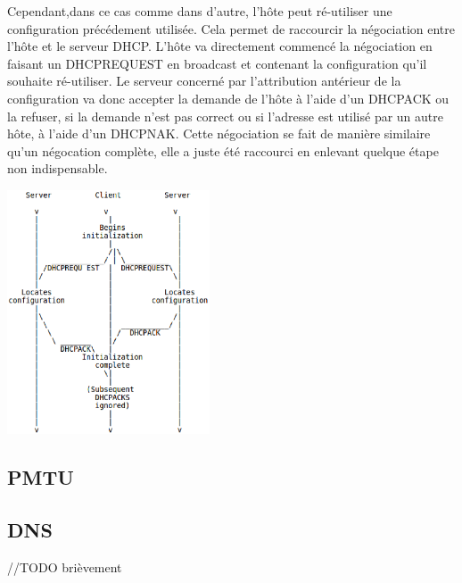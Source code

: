 Cependant,dans ce cas comme dans d'autre, l'hôte peut ré-utiliser une
configuration précédement utilisée. Cela permet de raccourcir la négociation
entre l'hôte et le serveur DHCP. L'hôte va directement commencé la négociation
en faisant un DHCPREQUEST en broadcast et contenant la configuration qu'il
souhaite ré-utiliser. Le serveur concerné par l'attribution antérieur de la
configuration va donc accepter la demande de l'hôte à l'aide d'un DHCPACK ou la
refuser, si la demande n'est pas correct ou si l'adresse est utilisé par un
autre hôte, à l'aide d'un DHCPNAK.  Cette négociation se fait de manière
similaire qu'un négocation complète, elle a juste été raccourci en enlevant
quelque étape non indispensable.

\includegraphics[width=6cm]{./pics/timeline_dhcp_reuse_add.eps}

\subsection{PMTU}
\subsection{DNS}
//TODO brièvement
